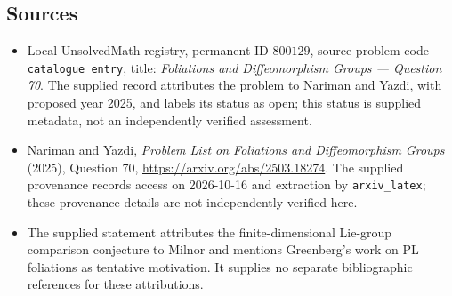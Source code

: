 \documentclass[11pt]{article}
\begin{document}
\subsection{Sources}
\begin{itemize}
\item Local UnsolvedMath registry, permanent ID \(800129\), source problem code \texttt{catalogue entry}, title: \emph{Foliations and Diffeomorphism Groups --- Question 70}. The supplied record attributes the problem to Nariman and Yazdi, with proposed year 2025, and labels its status as open; this status is supplied metadata, not an independently verified assessment.
\item Nariman and Yazdi, \emph{Problem List on Foliations and Diffeomorphism Groups} (2025), Question 70, \url{https://arxiv.org/abs/2503.18274}. The supplied provenance records access on 2026-10-16 and extraction by \texttt{arxiv\_latex}; these provenance details are not independently verified here.
\item The supplied statement attributes the finite-dimensional Lie-group comparison conjecture to Milnor and mentions Greenberg's work on PL foliations as tentative motivation. It supplies no separate bibliographic references for these attributions.
\end{itemize}
\end{document}

